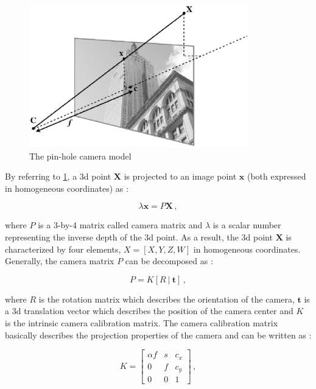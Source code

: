 \begin{figure}[htbp]
  \centering
  \includegraphics[width=0.85\textwidth]{gfx/pinholeCamera.eps}
  \caption{The pin-hole camera model \cite{solem2012programming}}
  \label{fig:pinholeCamera}
\end{figure}

By referring to \ref{fig:pinholeCamera}, a \acrshort{3d} point $\mathbf{X}$ is projected to an image point $\mathbf{x}$ (both expressed in homogeneous coordinates) as :

\begin{equation*}
  \lambda\mathbf{x}=P\mathbf{X} \,,
\end{equation*}

where $P$ is a 3-by-4 matrix called camera matrix and $\lambda$ is a scalar number representing the inverse depth of the \acrshort{3d} point. As a result, the \acrshort{3d} point $\mathbf{X}$ is characterized by four elements, $X = [X, Y , Z, W ]$ in homogeneous coordinates.
Generally, the camera matrix $P$ can be decomposed as :

\begin{equation*}
  P = K[R \ | \ \mathbf{t}] \,,
\end{equation*}

where $R$ is the rotation matrix which describes the orientation of the camera, $\mathbf{t}$ is a \acrshort{3d} translation vector which describes the position of the camera center and $K$ is the intrinsic camera calibration matrix.
The camera calibration matrix basically describes the projection properties of the camera and can be written as :

\begin{equation*}
  K = \begin{bmatrix}
    \alpha f & s & c_x \\
    0        & f & c_y \\
    0        & 0 & 1
  \end{bmatrix} \,,
\end{equation*}

